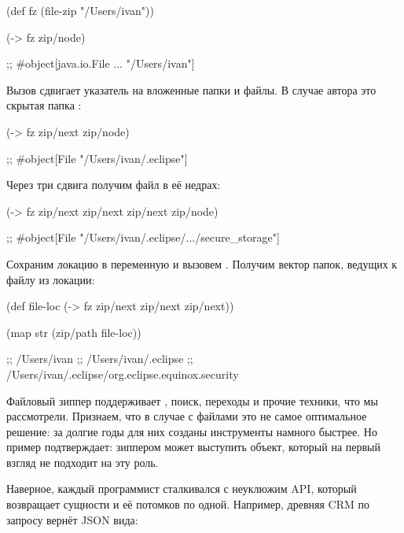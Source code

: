 \begin{english}
  \begin{clojure}
(def fz
  (file-zip "/Users/ivan"))

(-> fz zip/node)

;; #object[java.io.File ... "/Users/ivan"]
  \end{clojure}
\end{english}

Вызов  сдвигает указатель на вложенные папки и файлы. В случае автора
это скрытая папка :

\begin{english}
  \begin{clojure}
(-> fz zip/next zip/node)

;; #object[File "/Users/ivan/.eclipse"]
  \end{clojure}
\end{english}

Через три сдвига получим файл  в её недрах:

\begin{english}
  \begin{clojure}
(-> fz zip/next zip/next zip/next zip/node)

;; #object[File "/Users/ivan/.eclipse/.../secure_storage"]
  \end{clojure}
\end{english}

Сохраним локацию в переменную и вызовем . Получим вектор папок,
ведущих к файлу из локации:

\begin{english}
  \begin{clojure}
(def file-loc
  (-> fz zip/next zip/next zip/next))

(map str (zip/path file-loc))

;; /Users/ivan
;; /Users/ivan/.eclipse
;; /Users/ivan/.eclipse/org.eclipse.equinox.security
  \end{clojure}
\end{english}

Файловый зиппер поддерживает , поиск, переходы и прочие техники,
что мы рассмотрели. Признаем, что в случае с файлами это не самое оптимальное
решение: за долгие годы для них созданы инструменты намного быстрее. Но пример
подтверждает: зиппером может выступить объект, который на первый взгляд не
подходит на эту роль.


Наверное, каждый программист сталкивался с неуклюжим API, который возвращает
сущности и её потомков по одной. Например, древняя CRM по запросу  вернёт JSON вида:

